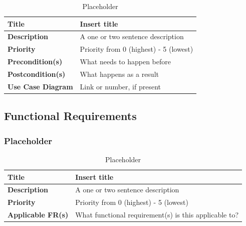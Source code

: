 \documentclass{article}
\begin{document}
\begin{table}[H]
	\caption{Placeholder}
	\begin{tabularx}{\textwidth}{|l|X|}
		\hline
		\textbf{Title}            & Insert title                           \\ \hline
		\textbf{Description}      & A one or two sentence description      \\ \hline
		\textbf{Priority}         & Priority from 0 (highest) - 5 (lowest) \\ \hline
		\textbf{Precondition(s)}  & What needs to happen before            \\ \hline
		\textbf{Postcondition(s)} & What happens as a result               \\ \hline
		\textbf{Use Case Diagram} & Link or number, if present             \\  \hline
	\end{tabularx}
\end{table}

\subsection{Functional Requirements}

\subsubsection{Placeholder}

\begin{table}[H]
	\caption{Placeholder}
	\begin{tabularx}{\textwidth}{|l|X|}
		\hline
		\textbf{Title}            & Insert title                                          \\ \hline
		\textbf{Description}      & A one or two sentence description                     \\ \hline
		\textbf{Priority}         & Priority from 0 (highest) - 5 (lowest)                \\ \hline
		\textbf{Applicable FR(s)} & What functional requirement(s) is this applicable to? \\ \hline
	\end{tabularx}
\end{table}
\end{document}
